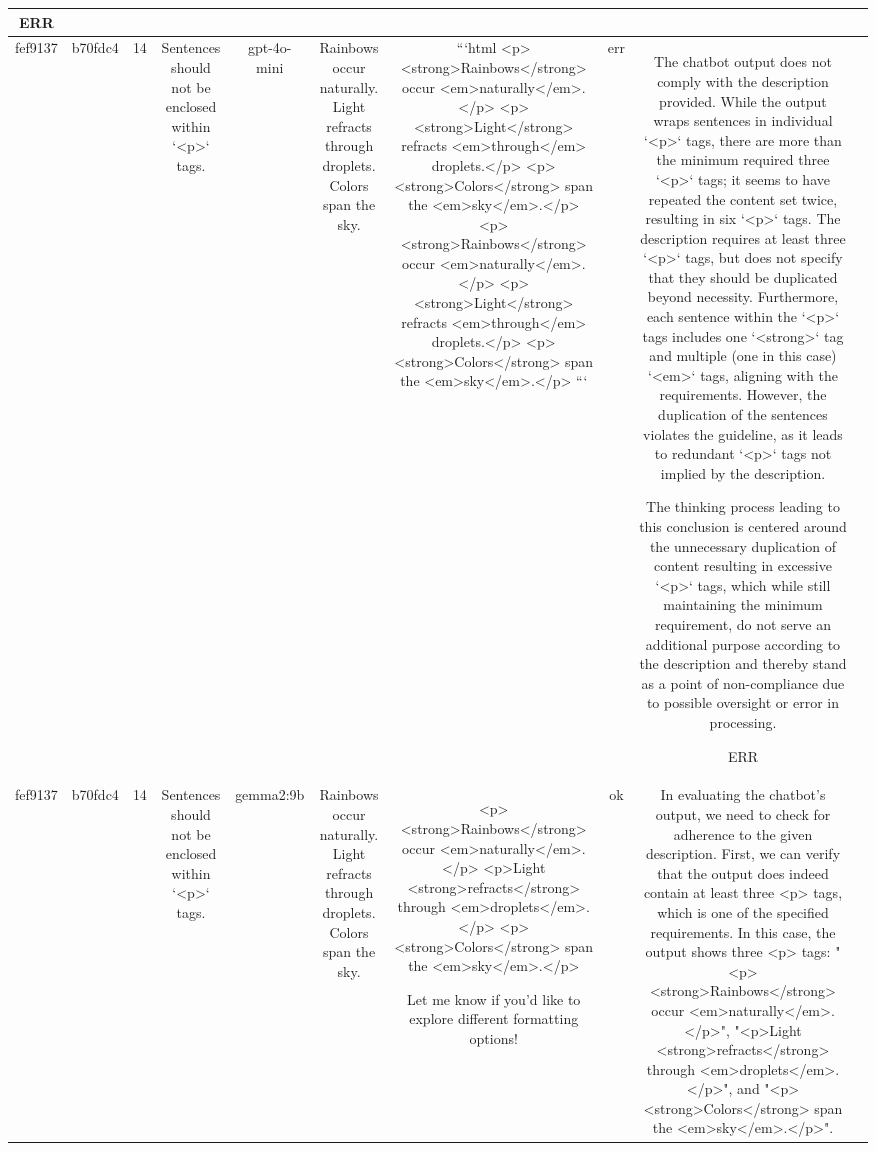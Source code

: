 \begin{table}[h!]
\begin{tabular}{|c|c|c|c|c|c|c|c|c|c|}
ERR & \\
\hline
fef9137 & b70fdc4 & 14 & Sentences should not be enclosed within `<p>` tags. & gpt-4o-mini & Rainbows occur naturally. Light refracts through droplets. Colors span the sky. & ```html
<p><strong>Rainbows</strong> occur <em>naturally</em>.</p>
<p><strong>Light</strong> refracts <em>through</em> droplets.</p>
<p><strong>Colors</strong> span the <em>sky</em>.</p>
<p><strong>Rainbows</strong> occur <em>naturally</em>.</p>
<p><strong>Light</strong> refracts <em>through</em> droplets.</p>
<p><strong>Colors</strong> span the <em>sky</em>.</p>
``` & err & The chatbot output does not comply with the description provided. While the output wraps sentences in individual `<p>` tags, there are more than the minimum required three `<p>` tags; it seems to have repeated the content set twice, resulting in six `<p>` tags. The description requires at least three `<p>` tags, but does not specify that they should be duplicated beyond necessity. Furthermore, each sentence within the `<p>` tags includes one `<strong>` tag and multiple (one in this case) `<em>` tags, aligning with the requirements. However, the duplication of the sentences violates the guideline, as it leads to redundant `<p>` tags not implied by the description.

The thinking process leading to this conclusion is centered around the unnecessary duplication of content resulting in excessive `<p>` tags, which while still maintaining the minimum requirement, do not serve an additional purpose according to the description and thereby stand as a point of non-compliance due to possible oversight or error in processing.

ERR & \\
\hline
fef9137 & b70fdc4 & 14 & Sentences should not be enclosed within `<p>` tags. & gemma2:9b & Rainbows occur naturally. Light refracts through droplets. Colors span the sky. & <p><strong>Rainbows</strong> occur <em>naturally</em>.</p>
<p>Light <strong>refracts</strong> through <em>droplets</em>.</p>
<p><strong>Colors</strong> span the <em>sky</em>.</p>  


Let me know if you'd like to explore different formatting options! & ok & In evaluating the chatbot's output, we need to check for adherence to the given description. First, we can verify that the output does indeed contain at least three <p> tags, which is one of the specified requirements. In this case, the output shows three <p> tags: "<p><strong>Rainbows</strong> occur <em>naturally</em>.</p>", "<p>Light <strong>refracts</strong> through <em>droplets</em>.</p>", and "<p><strong>Colors</strong> span the <em>sky</em>.</p>". 


\end{tabular}
\end{table}
